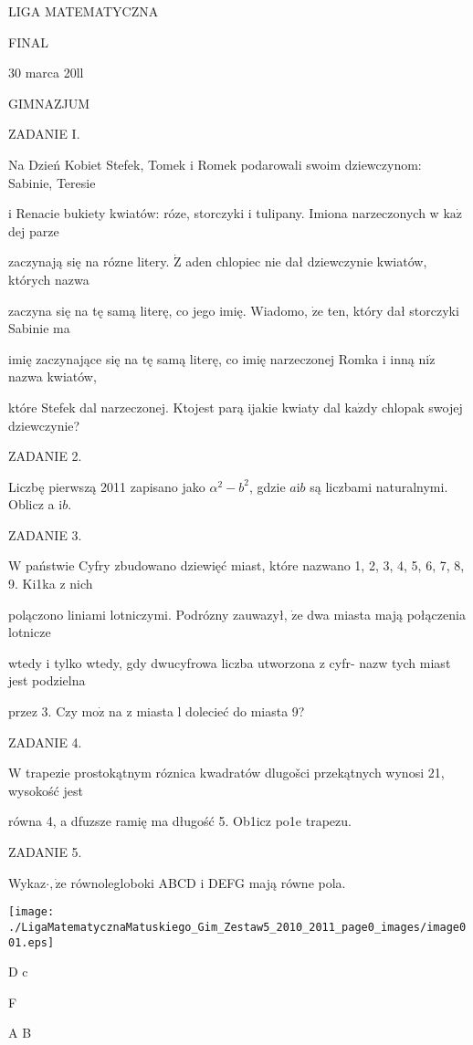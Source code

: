 \documentclass[a4paper,12pt]{article}
\begin{document}
LIGA MATEMATYCZNA

FINAL

30 marca 20ll

GIMNAZJUM

ZADANIE I.

Na Dzień Kobiet Stefek, Tomek i Romek podarowali swoim dziewczynom: Sabinie, Teresie

i Renacie bukiety kwiatów: róze, storczyki i tulipany. Imiona narzeczonych w $\mathrm{k}\mathrm{a}\dot{\mathrm{z}}$ dej parze

zaczynają się na rózne litery. $\dot{\mathrm{Z}}$ aden chlopiec nie dał dziewczynie kwiatów, których nazwa

zaczyna się na tę samą literę, co jego imię. Wiadomo, $\dot{\mathrm{z}}\mathrm{e}$ ten, który dał storczyki Sabinie ma

imię zaczynające się na tę samą literę, co imię narzeczonej Romka i inną $\mathrm{n}\mathrm{i}\dot{\mathrm{z}}$ nazwa kwiatów,

które Stefek dal narzeczonej. Ktojest parą ijakie kwiaty dal $\mathrm{k}\mathrm{a}\dot{\mathrm{z}}\mathrm{d}\mathrm{y}$ chlopak swojej dziewczynie?

ZADANIE 2.

Liczbę pierwszą 2011 zapisano jako $\alpha^{2}-b^{2}$, gdzie $a\mathrm{i}b$ są liczbami naturalnymi. Oblicz a $\mathrm{i}b.$

ZADANIE 3.

W państwie Cyfry zbudowano dziewięć miast, które nazwano 1, 2, 3, 4, 5, 6, 7, 8, 9. Ki1ka z nich

polączono liniami lotniczymi. Podrózny zauwazył, $\dot{\mathrm{z}}\mathrm{e}$ dwa miasta mają połączenia lotnicze

wtedy i tylko wtedy, gdy dwucyfrowa liczba utworzona z cyfr- nazw tych miast jest podzielna

przez 3. Czy $\mathrm{m}\mathrm{o}\dot{\mathrm{z}}$ na z miasta l dolecieć do miasta 9?

ZADANIE 4.

W trapezie prostokątnym róznica kwadratów dlugošci przekątnych wynosi 21, wysokość jest

równa 4, a dfuzsze ramię ma długość 5. Ob1icz po1e trapezu.

ZADANIE 5.

Wykaz$\cdot, \dot{\mathrm{z}}\mathrm{e}$ równolegloboki ABCD $\mathrm{i}$ DEFG mają równe pola.
\begin{center}
\texttt{[image: ./LigaMatematycznaMatuskiego\_Gim\_Zestaw5\_2010\_2011\_page0\_images/image001.eps]}
\end{center}
D  c

F

A  B
\end{document}
